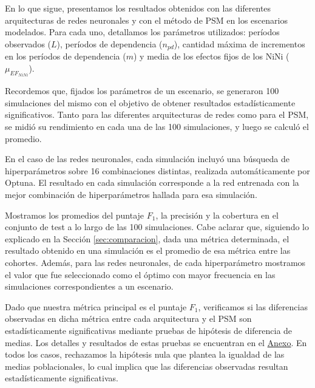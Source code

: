 \documentclass[../../main.tex]{subfiles}
\begin{document}
En lo que sigue, presentamos los resultados obtenidos con las diferentes arquitecturas de
redes neuronales y con el método de PSM en los escenarios modelados. Para cada uno,
detallamos los parámetros utilizados: períodos observados (\(L\)), períodos de dependencia
(\(n_{pd}\)), cantidad máxima de incrementos en los períodos de dependencia (\(m\)) y
media de los efectos fijos de los NiNi (\(\mu_{{EF}_{NiNi}}\)).

Recordemos que, fijados los parámetros de un escenario, se generaron 100 simulaciones del
mismo con el objetivo de obtener resultados estadísticamente significativos. Tanto para
las diferentes arquitecturas de redes como para el PSM, se midió su rendimiento en cada
una de las 100 simulaciones, y luego se calculó el promedio.

En el caso de las redes neuronales, cada simulación incluyó una búsqueda de
hiperparámetros sobre 16 combinaciones distintas, realizada automáticamente por Optuna. El
resultado en cada simulación corresponde a la red entrenada con la mejor combinación de
hiperparámetros hallada para esa simulación.

Mostramos los promedios del puntaje \(F_1\), la precisión y la cobertura en el conjunto de
test a lo largo de las 100 simulaciones. Cabe aclarar que, siguiendo lo explicado en la
Sección \ref{sec:comparacion}, dada una métrica determinada, el resultado obtenido en una
simulación es el promedio de esa métrica entre las cohortes. Además, para las redes
neuronales, de cada hiperparámetro mostramos el valor que fue seleccionado como el óptimo
con mayor frecuencia en las simulaciones correspondientes a un escenario.

Dado que nuestra métrica principal es el puntaje \(F_1\), verificamos si las diferencias
observadas en dicha métrica entre cada arquitectura y el PSM son estadísticamente
significativas mediante pruebas de hipótesis de diferencia de medias. Los detalles y
resultados de estas pruebas se encuentran en el \hyperref[chap:anexo]{Anexo}. En todos los
casos, rechazamos la hipótesis nula que plantea la igualdad de las medias poblacionales,
lo cual implica que las diferencias observadas resultan estadísticamente significativas.
\end{document}
